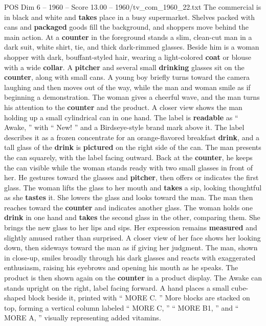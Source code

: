 \begin{textsample}{POS Dim 6 – 1960 – Score 13.00 – 1960/tv\_com\_1960\_22.txt}  \label{ex:f6_pos_028}
The commercial is in black and white and \textbf{takes} place in a busy supermarket.
Shelves packed with cans and \textbf{packaged} goods fill the background, and shoppers move behind the main action.
At a \textbf{counter} in the foreground stands a slim, clean-cut man in a dark suit, white shirt, tie, and thick dark-rimmed glasses.
Beside him is a woman shopper with dark, bouffant-styled hair, wearing a light-colored \textbf{coat} or blouse with a wide \textbf{collar}.
A \textbf{pitcher} and several small \textbf{drinking} glasses sit on the \textbf{counter}, along with small cans.
A young boy briefly turns toward the camera laughing and then moves out of the way, while the man and woman smile as if beginning a demonstration.
The woman gives a cheerful wave, and the man turns his attention to the \textbf{counter} and the product.
A closer view shows the man holding up a small cylindrical can in one hand.
The label is \textbf{readable} as “ Awake, ” with “ New! ” and a Birdseye-style brand mark above it.
The label describes it as a frozen concentrate for an orange-flavored breakfast \textbf{drink}, and a tall glass of the \textbf{drink} is \textbf{pictured} on the right side of the can.
The man presents the can squarely, with the label facing outward.
Back at the \textbf{counter}, he keeps the can visible while the woman stands ready with two small glasses in front of her.
He gestures toward the glasses and \textbf{pitcher}, then offers or indicates the first glass.
The woman lifts the glass to her mouth and \textbf{takes} a sip, looking thoughtful as she \textbf{tastes} it.
She lowers the glass and looks toward the man.
The man then reaches toward the \textbf{counter} and indicates another glass.
The woman holds one \textbf{drink} in one hand and \textbf{takes} the second glass in the other, comparing them.
She brings the new glass to her lips and sips.
Her expression remains \textbf{measured} and slightly amused rather than surprised.
A closer view of her face shows her looking down, then sideways toward the man as if giving her judgment.
The man, shown in close-up, smiles broadly through his dark glasses and reacts with exaggerated enthusiasm, raising his eyebrows and opening his mouth as he speaks.
The product is then shown again on the \textbf{counter} in a product display.
The Awake can stands upright on the right, label facing forward.
A hand places a small cube-shaped block beside it, printed with “ MORE C. ” More blocks are stacked on top, forming a vertical column labeled “ MORE C, ” “ MORE B1, ” and “ MORE A, ” visually representing added vitamins.

\end{textsample}
